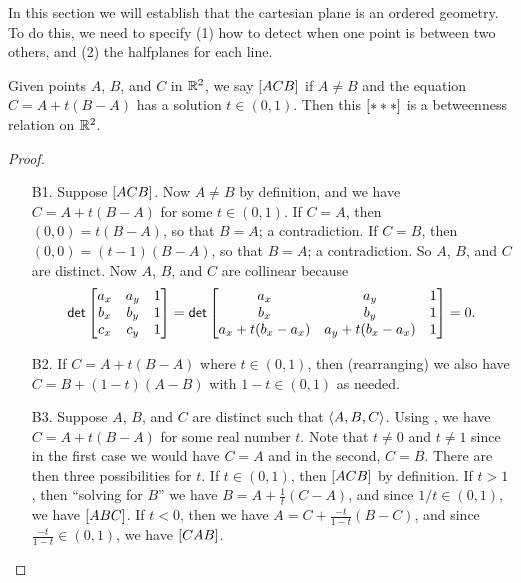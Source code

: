 In this section we will establish that the cartesian plane is an ordered geometry.
To do this, we need to specify (1) how to detect when one point is between two others, and (2) the halfplanes for each line.

\begin{prop}\label{prop:rr2-between}
Given points \(A\), \(B\), and \(C\) in \(\mathbb{R}^2\), we say \([ A C B ]\) if \(A \neq B\) and the equation \(C = A + t(B-A)\) has a solution \(t \in (0,1)\).
Then this \([ \ast \ast \ast ]\) is a betweenness relation on \(\mathbb{R}^2\).
\end{prop}

\begin{proof}\mbox{}
\begin{itemize}
\item[B1.] Suppose \([ A C B ]\).
Now \(A \neq B\) by definition, and we have \(C = A + t(B-A)\) for some \(t \in (0,1)\).
If \(C = A\), then \((0,0) = t(B-A)\), so that \(B = A\); a contradiction.
If \(C = B\), then \((0,0) = (t-1)(B-A)\), so that \(B = A\); a contradiction.
So \(A\), \(B\), and \(C\) are distinct.
Now \(A\), \(B\), and \(C\) are collinear because \[ \mathsf{det} \begin{bmatrix} a_x & a_y & 1 \\ b_x & b_y & 1 \\ c_x & c_y & 1 \end{bmatrix} = \mathsf{det} \begin{bmatrix} a_x & a_y & 1 \\ b_x & b_y & 1 \\ a_x + t(b_x-a_x) & a_y + t(b_x-a_x) & 1 \end{bmatrix} = 0. \]

\item[B2.] If \(C = A + t(B-A)\) where \(t \in (0,1)\), then (rearranging) we also have \(C = B + (1-t)(A-B)\) with \(1-t \in (0,1)\) as needed.

\item[B3.] Suppose \(A\), \(B\), and \(C\) are distinct such that \(\langle A, B, C \rangle\).
Using , we have \(C = A + t(B-A)\) for some real number \(t\).
Note that \(t \neq 0\) and \(t \neq 1\) since in the first case we would have \(C = A\) and in the second, \(C = B\).
There are then three possibilities for \(t\).
If \(t \in (0,1)\), then \([ A C B ]\) by definition.
If \(t > 1\), then ``solving for \(B\)'' we have \(B = A + \frac{1}{t}(C-A)\), and since \(1/t \in (0,1)\), we have \([ A B C ]\).
If \(t < 0\), then we have \(A = C + \frac{-t}{1-t}(B-C)\), and since \(\frac{-t}{1-t} \in (0,1)\), we have \([ C A B ]\).


\end{itemize}
\end{proof}
